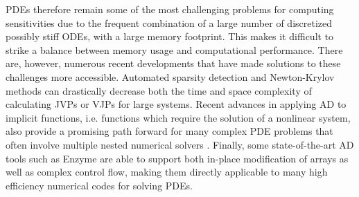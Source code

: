 PDEs therefore remain some of the most challenging problems for computing sensitivities due to the frequent combination of a large number of discretized possibly stiff ODEs, with a large memory footprint. 
This makes it difficult to strike a balance between memory usage and computational performance. 
There are, however, numerous recent developments that have made solutions to these challenges more accessible. 
Automated sparsity detection \cite{gowdaSparsityProgrammingAutomated2019} and Newton-Krylov methods \cite{knollJacobianfreeNewtonKrylov2004,montoisonKrylovJlJulia2023} can drastically decrease both the time and space complexity of calculating JVPs or VJPs for large systems. 
Recent advances in applying AD to implicit functions, i.e. functions which require the solution of a nonlinear system, also provide a promising path forward for many complex PDE problems that often involve multiple nested numerical solvers \cite{blondelEfficientModularImplicit2022a}. 
Finally, some state-of-the-art AD tools such as Enzyme \cite{moses_Enzyme} are able to support both in-place modification of arrays as well as complex control flow, making them directly applicable to many high efficiency numerical codes for solving PDEs.






